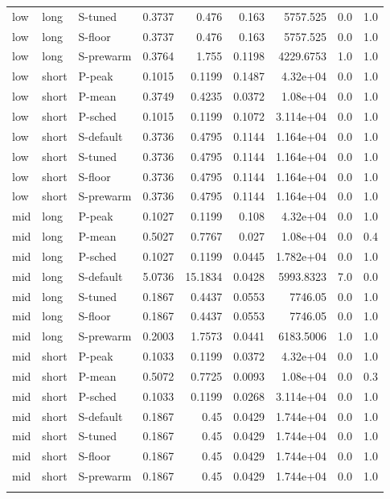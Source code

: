 \begin{table}[htbp]
\begin{tabular}{lllrrrrrr}
low & long & S-tuned & 0.3737 & 0.476 & 0.163 & 5757.525 & 0.0 & 1.0 \\
low & long & S-floor & 0.3737 & 0.476 & 0.163 & 5757.525 & 0.0 & 1.0 \\
low & long & S-prewarm & 0.3764 & 1.755 & 0.1198 & 4229.6753 & 1.0 & 1.0 \\
low & short & P-peak & 0.1015 & 0.1199 & 0.1487 & 4.32e+04 & 0.0 & 1.0 \\
low & short & P-mean & 0.3749 & 0.4235 & 0.0372 & 1.08e+04 & 0.0 & 1.0 \\
low & short & P-sched & 0.1015 & 0.1199 & 0.1072 & 3.114e+04 & 0.0 & 1.0 \\
low & short & S-default & 0.3736 & 0.4795 & 0.1144 & 1.164e+04 & 0.0 & 1.0 \\
low & short & S-tuned & 0.3736 & 0.4795 & 0.1144 & 1.164e+04 & 0.0 & 1.0 \\
low & short & S-floor & 0.3736 & 0.4795 & 0.1144 & 1.164e+04 & 0.0 & 1.0 \\
low & short & S-prewarm & 0.3736 & 0.4795 & 0.1144 & 1.164e+04 & 0.0 & 1.0 \\
mid & long & P-peak & 0.1027 & 0.1199 & 0.108 & 4.32e+04 & 0.0 & 1.0 \\
mid & long & P-mean & 0.5027 & 0.7767 & 0.027 & 1.08e+04 & 0.0 & 0.4 \\
mid & long & P-sched & 0.1027 & 0.1199 & 0.0445 & 1.782e+04 & 0.0 & 1.0 \\
mid & long & S-default & 5.0736 & 15.1834 & 0.0428 & 5993.8323 & 7.0 & 0.0 \\
mid & long & S-tuned & 0.1867 & 0.4437 & 0.0553 & 7746.05 & 0.0 & 1.0 \\
mid & long & S-floor & 0.1867 & 0.4437 & 0.0553 & 7746.05 & 0.0 & 1.0 \\
mid & long & S-prewarm & 0.2003 & 1.7573 & 0.0441 & 6183.5006 & 1.0 & 1.0 \\
mid & short & P-peak & 0.1033 & 0.1199 & 0.0372 & 4.32e+04 & 0.0 & 1.0 \\
mid & short & P-mean & 0.5072 & 0.7725 & 0.0093 & 1.08e+04 & 0.0 & 0.3 \\
mid & short & P-sched & 0.1033 & 0.1199 & 0.0268 & 3.114e+04 & 0.0 & 1.0 \\
mid & short & S-default & 0.1867 & 0.45 & 0.0429 & 1.744e+04 & 0.0 & 1.0 \\
mid & short & S-tuned & 0.1867 & 0.45 & 0.0429 & 1.744e+04 & 0.0 & 1.0 \\
mid & short & S-floor & 0.1867 & 0.45 & 0.0429 & 1.744e+04 & 0.0 & 1.0 \\
mid & short & S-prewarm & 0.1867 & 0.45 & 0.0429 & 1.744e+04 & 0.0 & 1.0 \\
\botrule
\end{tabular}
\end{table}
